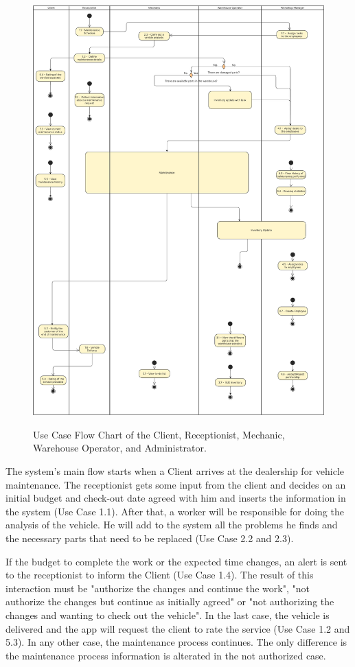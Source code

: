 \begin{figure}[h]
  \caption{Use Case Flow Chart of the Client, Receptionist, Mechanic, Warehouse Operator, and Administrator.}
  \centering
  \includegraphics[width=\textwidth]{figs/UseCaseDiagram - General}
  \label{fig:figure2}
\end{figure}

The system's main flow starts when a Client arrives at the dealership for vehicle maintenance. 
The receptionist gets some input from the client and decides on an initial budget and check-out date agreed with him and inserts the information in the system (Use Case 1.1).
After that, a worker will be responsible for doing the analysis of the vehicle. 
He will add to the system all the problems he finds and the necessary parts that need to be replaced (Use Case 2.2 and 2.3).


If the budget to complete the work or the expected time changes, an alert is sent to the receptionist to inform the Client (Use Case 1.4). 
The result of this interaction must be "authorize the changes and continue the work", "not authorize the changes but continue as initially agreed" or "not authorizing the changes and wanting to check out the vehicle".
In the last case, the vehicle is delivered and the app will request the client to rate the service (Use Case 1.2 and 5.3). 
In any other case, the maintenance process continues. The only difference is the maintenance process information is alterated in the not authorized case.

